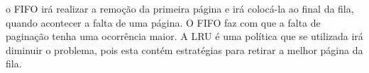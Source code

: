 \begin{question}
     
    o FIFO irá realizar a remoção da primeira página e irá colocá-la 
    ao final da fila, quando acontecer a falta de uma página. O FIFO faz com 
    que a falta de paginação tenha uma ocorrência maior. A LRU é uma política 
    que se utilizada irá diminuir o problema, pois esta contém estratégias 
    para retirar a melhor página da fila.

\end{question}
